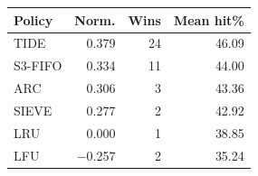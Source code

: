 \begin{tabular}{lrrr}
\toprule
Policy & Norm. & Wins & Mean hit\% \\
\midrule
TIDE & 0.379 & 24 & 46.09 \\
S3-FIFO & 0.334 & 11 & 44.00 \\
ARC & 0.306 & 3 & 43.36 \\
SIEVE & 0.277 & 2 & 42.92 \\
LRU & 0.000 & 1 & 38.85 \\
LFU & $-$0.257 & 2 & 35.24 \\
\bottomrule
\end{tabular}
